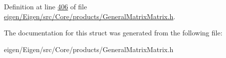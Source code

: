 Definition at line \hyperlink{eigen_2_eigen_2src_2_core_2products_2_general_matrix_matrix_8h_source_l00406}{406} of file \hyperlink{eigen_2_eigen_2src_2_core_2products_2_general_matrix_matrix_8h_source}{eigen/\+Eigen/src/\+Core/products/\+General\+Matrix\+Matrix.\+h}.



The documentation for this struct was generated from the following file\+:\begin{DoxyCompactItemize}
\item 
eigen/\+Eigen/src/\+Core/products/\+General\+Matrix\+Matrix.\+h\end{DoxyCompactItemize}
